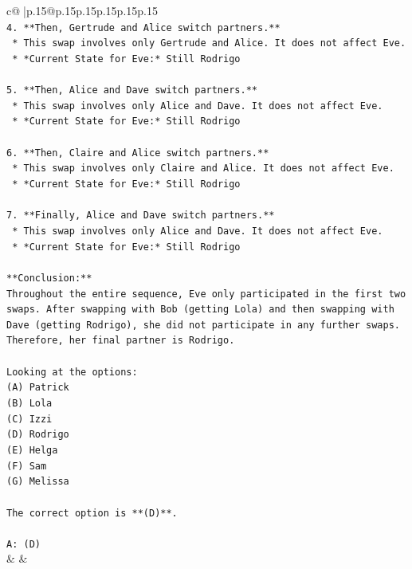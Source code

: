 \documentclass{article}
\begin{document}
{\begin{supertabular}{c@{$\;$}|p{.15\linewidth}@{}p{.15\linewidth}p{.15\linewidth}p{.15\linewidth}p{.15\linewidth}p{.15\linewidth}}
{{{\\ 
\texttt{4.  **Then, Gertrude and Alice switch partners.**} \\
\texttt{    *   This swap involves only Gertrude and Alice. It does not affect Eve.} \\
\texttt{    *   *Current State for Eve:* Still Rodrigo} \\
\\ 
\texttt{5.  **Then, Alice and Dave switch partners.**} \\
\texttt{    *   This swap involves only Alice and Dave. It does not affect Eve.} \\
\texttt{    *   *Current State for Eve:* Still Rodrigo} \\
\\ 
\texttt{6.  **Then, Claire and Alice switch partners.**} \\
\texttt{    *   This swap involves only Claire and Alice. It does not affect Eve.} \\
\texttt{    *   *Current State for Eve:* Still Rodrigo} \\
\\ 
\texttt{7.  **Finally, Alice and Dave switch partners.**} \\
\texttt{    *   This swap involves only Alice and Dave. It does not affect Eve.} \\
\texttt{    *   *Current State for Eve:* Still Rodrigo} \\
\\ 
\texttt{**Conclusion:**} \\
\texttt{Throughout the entire sequence, Eve only participated in the first two swaps. After swapping with Bob (getting Lola) and then swapping with Dave (getting Rodrigo), she did not participate in any further swaps. Therefore, her final partner is Rodrigo.} \\
\\ 
\texttt{Looking at the options:} \\
\texttt{(A) Patrick} \\
\texttt{(B) Lola} \\
\texttt{(C) Izzi} \\
\texttt{(D) Rodrigo} \\
\texttt{(E) Helga} \\
\texttt{(F) Sam} \\
\texttt{(G) Melissa} \\
\\ 
\texttt{The correct option is **(D)**.} \\
\\ 
\texttt{A: (D)} \\
            }
        }
    }
    & & \\ \\


\end{supertabular}}
\end{document}
